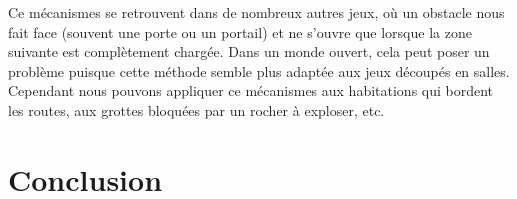 \documentclass[a4paper, 11pt]{article} %
\begin{document}
Ce mécanismes se retrouvent dans de nombreux autres jeux, où un obstacle nous fait face (souvent une porte ou un portail) et ne s'ouvre que lorsque la zone suivante est complètement chargée.
Dans un monde ouvert, cela peut poser un problème puisque cette méthode semble plus adaptée aux jeux découpés en salles. Cependant nous pouvons appliquer ce mécanismes aux habitations qui bordent les routes, aux grottes bloquées par un rocher à exploser, etc.



\newpage
\section{Conclusion}

\newpage



\end{document}
